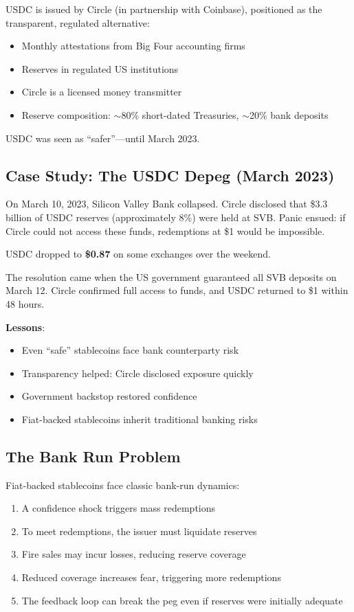 \documentclass[11pt,a4paper]{article}
\newcommand{\keyword}[1]{\textbf{\textcolor{AccentOrange}{#1}}}
\begin{document}
USDC is issued by Circle (in partnership with Coinbase), positioned as the transparent, regulated alternative:
\begin{itemize}
    \item Monthly attestations from Big Four accounting firms
    \item Reserves in regulated US institutions
    \item Circle is a licensed money transmitter
    \item Reserve composition: $\sim$80\% short-dated Treasuries, $\sim$20\% bank deposits
\end{itemize}

USDC was seen as ``safer''---until March 2023.

\subsection{Case Study: The USDC Depeg (March 2023)}

On March 10, 2023, Silicon Valley Bank collapsed. Circle disclosed that \$3.3 billion of USDC reserves (approximately 8\%) were held at SVB. Panic ensued: if Circle could not access these funds, redemptions at \$1 would be impossible.

USDC dropped to \keyword{\$0.87} on some exchanges over the weekend.

The resolution came when the US government guaranteed all SVB deposits on March 12. Circle confirmed full access to funds, and USDC returned to \$1 within 48 hours.

\textbf{Lessons}:
\begin{itemize}
    \item Even ``safe'' stablecoins face bank counterparty risk
    \item Transparency helped: Circle disclosed exposure quickly
    \item Government backstop restored confidence
    \item Fiat-backed stablecoins inherit traditional banking risks
\end{itemize}

\subsection{The Bank Run Problem}

Fiat-backed stablecoins face classic bank-run dynamics:

\begin{enumerate}
    \item A confidence shock triggers mass redemptions
    \item To meet redemptions, the issuer must liquidate reserves
    \item Fire sales may incur losses, reducing reserve coverage
    \item Reduced coverage increases fear, triggering more redemptions
    \item The feedback loop can break the peg even if reserves were initially adequate
\end{enumerate}
\end{document}
